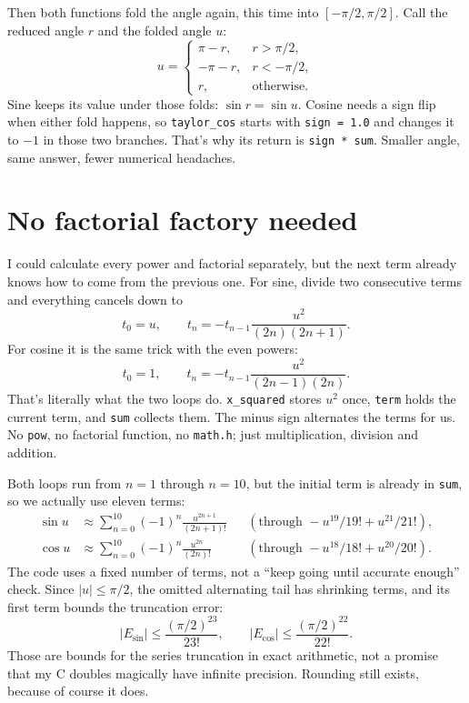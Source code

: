 \documentclass{article}
\begin{document}
Then both functions fold the angle again, this time into
$[-\pi/2,\pi/2]$. Call the reduced angle $r$ and the folded angle $u$:
\[
    u =
    \begin{cases}
        \pi-r,  & r > \pi/2, \\
        -\pi-r, & r < -\pi/2, \\
        r,      & \text{otherwise}.
    \end{cases}
\]
Sine keeps its value under those folds: $\sin r = \sin u$.
Cosine needs a sign flip when either fold happens, so
\texttt{taylor\_cos} starts with \texttt{sign = 1.0} and changes it to
$-1$ in those two branches. That's why its return is
\texttt{sign * sum}. Smaller angle, same answer, fewer numerical headaches.

\section*{No factorial factory needed}

I could calculate every power and factorial separately, but the next term
already knows how to come from the previous one. For sine, divide two
consecutive terms and everything cancels down to
\[
    t_0=u, \qquad
    t_n=-t_{n-1}\frac{u^2}{(2n)(2n+1)}.
\]
For cosine it is the same trick with the even powers:
\[
    t_0=1, \qquad
    t_n=-t_{n-1}\frac{u^2}{(2n-1)(2n)}.
\]
That's literally what the two loops do. \texttt{x\_squared} stores $u^2$
once, \texttt{term} holds the current term, and \texttt{sum} collects them.
The minus sign alternates the terms for us. No \texttt{pow}, no factorial
function, no \texttt{math.h}; just multiplication, division and addition.

Both loops run from $n=1$ through $n=10$, but the initial term is already
in \texttt{sum}, so we actually use eleven terms:
\begin{align*}
    \sin u &\approx \sum_{n=0}^{10}{(-1)}^n\frac{u^{2n+1}}{(2n+1)!}
             &&(\text{through }-u^{19}/19! + u^{21}/21!), \\
    \cos u &\approx \sum_{n=0}^{10}{(-1)}^n\frac{u^{2n}}{(2n)!}
             &&(\text{through }-u^{18}/18! + u^{20}/20!).
\end{align*}
The code uses a fixed number of terms, not a ``keep going until accurate
enough'' check. Since $|u|\leq\pi/2$, the omitted alternating tail has shrinking
terms, and its first term bounds the truncation error:
\[
    |E_{\sin}|\leq\frac{{(\pi/2)}^{23}}{23!}, \qquad
    |E_{\cos}|\leq\frac{{(\pi/2)}^{22}}{22!}.
\]
Those are bounds for the series truncation in exact arithmetic, not a promise
that my C doubles magically have infinite precision. Rounding still exists,
because of course it does.
\end{document}
